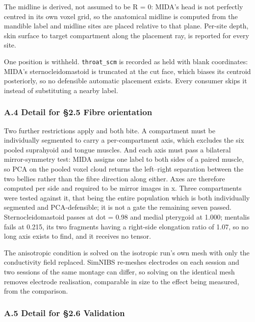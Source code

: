 \documentclass[manuscript,review,anonymous]{acmart}
\begin{document}
The midline is derived, not assumed to be R = 0: MIDA's head is not perfectly
centred in its own voxel grid, so the anatomical midline is computed from the
mandible label and midline sites are placed relative to that plane. Per-site
depth, skin surface to target compartment along the placement ray, is reported
for every site.

One position is withheld. \texttt{throat\_scm} is recorded as held with blank
coordinates: MIDA's sternocleidomastoid is truncated at the cut face, which
biases its centroid posteriorly, so no defensible automatic placement exists.
Every consumer skips it instead of substituting a nearby label.

\subsubsection{A.4 Detail for \S{}2.5 Fibre orientation}\label{a.4-detail-for-2.5-fibre-orientation}

Two further restrictions apply and both bite. A compartment must be individually
segmented to carry a per-compartment axis, which excludes the six pooled
suprahyoid and tongue muscles. And each axis must pass a bilateral
mirror-symmetry test: MIDA assigns one label to both sides of a paired muscle,
so PCA on the pooled voxel cloud returns the left--right separation between the
two bellies rather than the fibre direction along either. Axes are therefore
computed per side and required to be mirror images in x. Three compartments were
tested against it, that being the entire population which is both individually
segmented and PCA-defensible; it is not a gate the remaining seven passed.
Sternocleidomastoid
passes at \textbar dot\textbar{} = 0.98 and medial pterygoid at 1.000; mentalis fails at 0.215,
its two fragments having a right-side elongation ratio of 1.07, so no long axis
exists to find, and it receives no tensor.

The anisotropic condition is solved on the isotropic run's own mesh with only
the conductivity field replaced. SimNIBS re-meshes electrodes on each session
and two sessions of the same montage can differ, so solving on the identical
mesh removes electrode realisation, comparable in size to the effect being
measured, from the comparison.

\subsubsection{A.5 Detail for \S{}2.6 Validation}\label{a.5-detail-for-2.6-validation}
\end{document}
